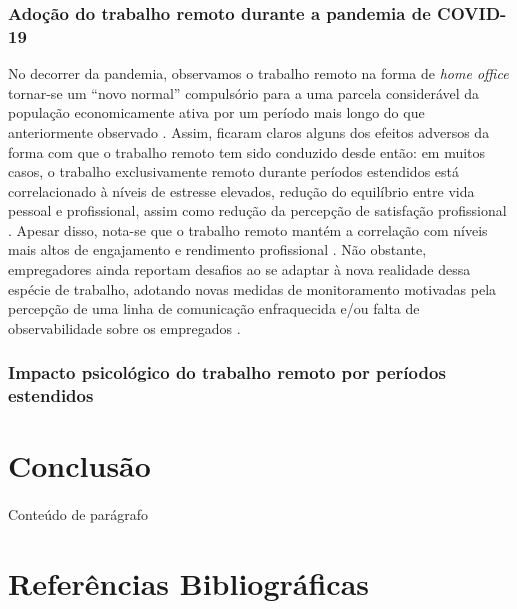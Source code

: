 \documentclass[12pt]{article}
\begin{document}
\subsubsection{Adoção do trabalho remoto durante a pandemia de COVID-19}

No decorrer da pandemia, observamos o trabalho remoto na forma de \textit{home office} tornar-se um ``novo
normal'' compulsório para a uma parcela considerável da população economicamente ativa por um período mais longo do que
anteriormente observado \cite{mckinsey2022,sustainability2022,phillips2020}. Assim, ficaram claros alguns dos efeitos adversos da forma com
que o trabalho remoto tem sido conduzido desde então: em muitos casos, o trabalho exclusivamente remoto durante
períodos estendidos está correlacionado à níveis de estresse elevados, redução do equilíbrio entre vida pessoal e profissional,
assim como redução da percepção de satisfação profissional \cite{ijerph2021,forbes2023}. Apesar disso, nota-se que o trabalho
remoto mantém a correlação com níveis mais altos de engajamento e rendimento profissional \cite{ijerph2021,ntwe2017}.
Não obstante, empregadores ainda reportam desafios ao se adaptar à nova realidade dessa espécie de trabalho, adotando
novas medidas de monitoramento motivadas pela percepção de uma linha de comunicação enfraquecida e/ou falta de observabilidade
sobre os empregados \cite{hofschulteBeck2022}.

\subsubsection{Impacto psicológico do trabalho remoto por períodos estendidos}




\section{Conclusão}
\paragraph{}

Conteúdo de parágrafo

\newpage
\section{Referências Bibliográficas}


\end{document}
